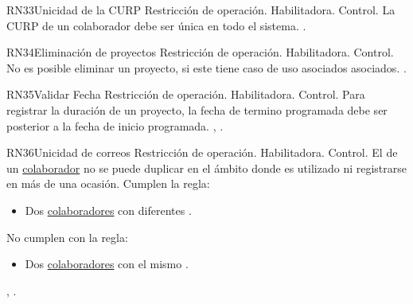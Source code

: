 \begin{BussinesRule}{RN33}{Unicidad de la CURP} 
	\BRitem[Tipo:] Restricción de operación. 
	\BRitem[Clase:] Habilitadora. 
	\BRitem[Nivel:] Control. %
	\BRitem[Descripción:] La CURP de un colaborador debe ser única en todo el sistema.
	 . 
\end{BussinesRule}


\begin{BussinesRule}{RN34}{Eliminación de proyectos} 
	\BRitem[Tipo:] Restricción de operación. 
	\BRitem[Clase:] Habilitadora. 
	\BRitem[Nivel:] Control. %
	\BRitem[Descripción:] No es posible eliminar un proyecto, si este tiene caso de uso asociados asociados.
	 . 
\end{BussinesRule}


\begin{BussinesRule}{RN35}{Validar Fecha} 
	\BRitem[Tipo:] Restricción de operación. 
	\BRitem[Clase:] Habilitadora. 
	\BRitem[Nivel:] Control. %
	\BRitem[Descripción:] Para registrar la duración de un proyecto, la fecha de termino programada debe ser posterior a la fecha de inicio programada.
	 , . 
\end{BussinesRule}


\begin{BussinesRule}{RN36}{Unicidad de correos} 
	\BRitem[Tipo:] Restricción de operación. 
	\BRitem[Clase:] Habilitadora. 
	\BRitem[Nivel:] Control. %
	\BRitem[Descripción:] El  de un \hyperlink{colaboradorEntidad}{colaborador} no se puede duplicar en el ámbito donde es utilizado ni registrarse en más de una ocasión.
	 Cumplen la regla:
	\begin{itemize}
		\item Dos \hyperlink{colaboradorEntidad}{colaboradores} con diferentes .
	\end{itemize}
	 No cumplen con la regla:
	\begin{itemize}
		\item Dos \hyperlink{colaboradorEntidad}{colaboradores} con el mismo .
	\end{itemize}
	 , . 
\end{BussinesRule}


